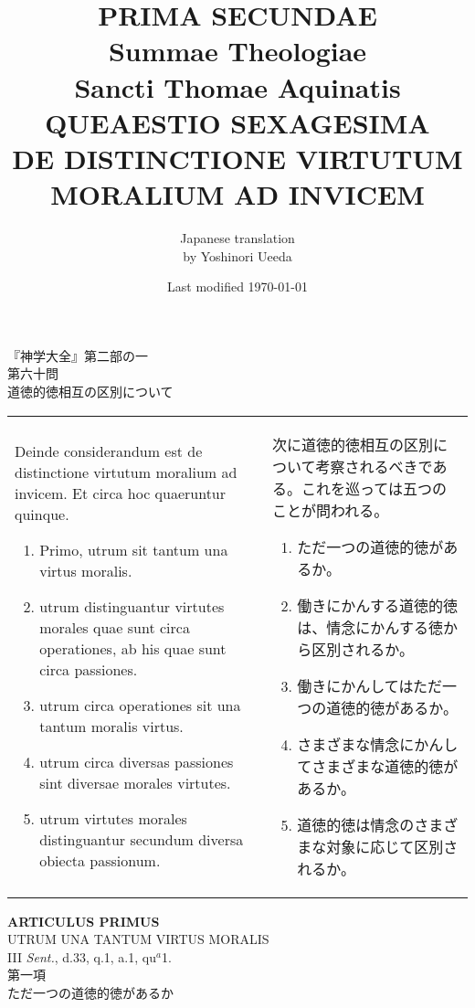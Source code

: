 \documentclass[10pt]{jsarticle}
\title{{\bf PRIMA SECUNDAE}\\{\HUGE Summae Theologiae}\\Sancti Thomae
Aquinatis\\{\sffamily QUEAESTIO SEXAGESIMA}\\DE DISTINCTIONE VIRTUTUM MORALIUM AD INVICEM}
\author{Japanese translation\\by Yoshinori {\sc Ueeda}}
\date{Last modified \today}
\begin{document}
\maketitle
\thispagestyle{empty}

\begin{center}
{\LARGE 『神学大全』第二部の一}\\
{\Large 第六十問\\道徳的徳相互の区別について}
\end{center}

\begin{longtable}{p{21em}p{21em}}

Deinde considerandum est de distinctione virtutum moralium ad
invicem. Et circa hoc quaeruntur quinque.
  
\begin{enumerate}
 \item Primo, utrum sit tantum una virtus moralis.
 \item utrum distinguantur virtutes morales quae sunt circa operationes, ab his quae sunt circa passiones.
 \item utrum circa operationes sit una tantum moralis virtus.
 \item utrum circa diversas passiones sint diversae morales virtutes.
 \item utrum virtutes morales distinguantur secundum diversa obiecta passionum.
\end{enumerate}

&

 次に道徳的徳相互の区別について考察されるべきである。これを巡っては五つのことが問われる。

\begin{enumerate}
 \item ただ一つの道徳的徳があるか。
 \item 働きにかんする道徳的徳は、情念にかんする徳から区別されるか。
 \item 働きにかんしてはただ一つの道徳的徳があるか。
 \item さまざまな情念にかんしてさまざまな道徳的徳があるか。
 \item 道徳的徳は情念のさまざまな対象に応じて区別されるか。
\end{enumerate}
\end{longtable}
\newpage

\begin{center}
{\Large {\bf ARTICULUS PRIMUS}}\\
{\large UTRUM UNA TANTUM VIRTUS MORALIS}\\
{\footnotesize III {\itshape Sent.}, d.33, q.1, a.1, qu$^{a}$1.}\\
{\Large 第一項\\ただ一つの道徳的徳があるか}
\end{center}
\end{document}
